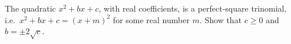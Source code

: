 The quadratic $x^2+bx+c$, with real coefficients, is a perfect-square trinomial, i.e.\ $x^2+bx+c=(x+m)^2$ for some real number $m$. Show that $c\ge0$ and $b=\pm2\sqrt c$.
